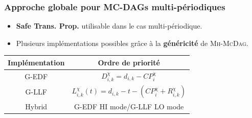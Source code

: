 \documentclass[xcolor=table]{beamer}
\begin{document}

\begin{frame}
	\frametitle{Approche globale pour MC-DAGs multi-périodiques}
	
	\begin{itemize}
		\item \textbf{Safe Trans. Prop.} utilisable dans le cas multi-périodique.
		\item Plusieurs implémentations possibles grâce à la \textbf{généricité} de \textsc{Mh-McDag}.
	\end{itemize}
	
	\begin{table}
		\begin{tabular}{|c|c|}
			\hline
			\textbf{Implémentation} & \textbf{Ordre de priorité}                                           \\ \hline
			G-EDF                   & $D_{i,k}^\chi = d_{i,k} - 
			CP_i^{\chi}$                            \\ \hline
			G-LLF                   & $L_{i,k}^\chi (t) = d_{i,k} - t - 
			(CP_i^{\chi} + R_{i,k}^{\chi})$ \\ \hline
			Hybrid                  & G-EDF HI mode/G-LLF LO 
			mode                                      \\ \hline
		\end{tabular}
	\end{table}
	
\end{frame}


\end{document}

